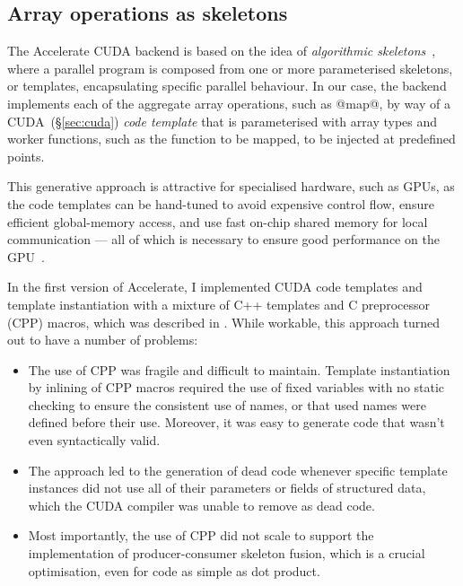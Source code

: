\subsection{Array operations as skeletons}

The Accelerate CUDA backend is based on the idea of \skeleton{}\emph{algorithmic
skeletons}~\cite{Cole:1989vr}, where a parallel program is composed from one or
more parameterised skeletons, or templates, encapsulating specific parallel
behaviour. In our case, the backend implements each of the aggregate array
operations, such as @map@, by way of a CUDA~(\S\ref{sec:cuda}) \emph{code
template} that is parameterised with array types and worker functions, such as
the function to be mapped, to be injected at predefined points.

This generative approach is attractive for specialised hardware, such as GPUs,
as the code templates can be hand-tuned to avoid expensive control flow, ensure
efficient global-memory access, and use fast on-chip shared memory for local
communication --- all of which is necessary to ensure good performance on the
GPU~\cite{NVIDIA:2012wf}.

In the first version of Accelerate, I implemented CUDA code templates and
template instantiation with a mixture of C++ templates and C preprocessor (CPP)
macros, which was described in \cite{Chakravarty:2011fr}. While workable, this
approach turned out to have a number of problems:

\begin{itemize}
    \item The use of CPP was fragile and difficult to maintain. Template
        instantiation by inlining of CPP macros required the use of fixed
        variables with no static checking to ensure the consistent use of names,
        or that used names were defined before their use. Moreover, it was easy
        to generate code that wasn't even syntactically valid.

    \item The approach led to the generation of dead code whenever specific
        template instances did not use all of their parameters or fields of
        structured data, which the CUDA compiler was unable to remove as dead
        code.

    \item Most importantly, the use of CPP did not scale to support the
        implementation of producer-consumer skeleton fusion, which is a crucial
        optimisation, even for code as simple as dot product.

\end{itemize}

